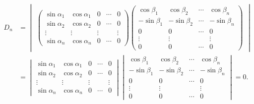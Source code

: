 \documentclass[../../main.tex]{subfiles}
\begin{document}
\begin{solution}
\[\begin{aligned}
D_n &= \begin{vmatrix} \begin{pmatrix} \sin \alpha_1 & \cos \alpha_1 & 0 & \cdots & 0 \\ \sin \alpha_2 & \cos \alpha_2 & 0 & \cdots & 0 \\ \vdots & \vdots & \vdots & & \vdots \\ \sin \alpha_n & \cos \alpha_n & 0 & \cdots & 0 \end{pmatrix} \begin{pmatrix} \cos \beta_1 & \cos \beta_2 & \cdots & \cos \beta_n \\ -\sin \beta_1 & -\sin \beta_2 & \cdots & -\sin \beta_n \\ 0 & 0 & \cdots & 0 \\ \vdots & \vdots & & \vdots \\ 0 & 0 & \cdots & 0 \end{pmatrix} \end{vmatrix} \\
&= \begin{vmatrix} \sin \alpha_1 & \cos \alpha_1 & 0 & \cdots & 0 \\ \sin \alpha_2 & \cos \alpha_2 & 0 & \cdots & 0 \\ \vdots & \vdots & \vdots & & \vdots \\ \sin \alpha_n & \cos \alpha_n & 0 & \cdots & 0 \end{vmatrix} \begin{vmatrix} \cos \beta_1 & \cos \beta_2 & \cdots & \cos \beta_n \\ -\sin \beta_1 & -\sin \beta_2 & \cdots & -\sin \beta_n \\ 0 & 0 & \cdots & 0 \\ \vdots & \vdots & & \vdots \\ 0 & 0 & \cdots & 0 \end{vmatrix} = 0.
\end{aligned}
\]

\end{solution}
\end{document}
